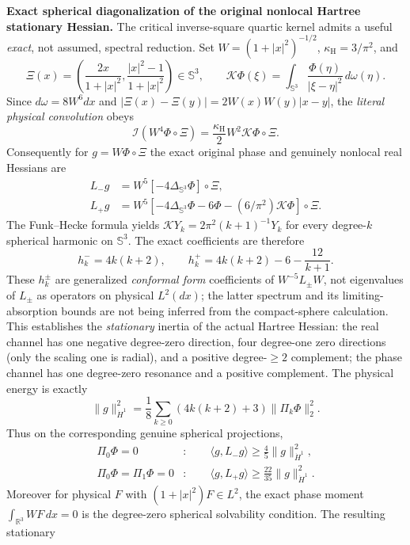 \documentclass[11pt]{amsart}
\begin{document}
\medskip
\noindent\textbf{Exact spherical diagonalization of the original nonlocal Hartree stationary Hessian.}
The critical inverse-square quartic kernel admits a useful
\emph{exact}, not assumed, spectral reduction. Set
\(W=(1+|x|^2)^{-1/2}\), \(\kappa_{\mathrm H}=3/\pi^2\), and
\[
 \Xi(x)=\left(\frac{2x}{1+|x|^2},
                \frac{|x|^2-1}{1+|x|^2}\right)\in\mathbb S^3,
 \qquad
 \mathscr K\Phi(\xi)=
 \int_{\mathbb S^3}\frac{\Phi(\eta)}{|\xi-\eta|^2}\,d\omega(\eta).
\]
Since \(d\omega=8W^6dx\) and
\(|\Xi(x)-\Xi(y)|=2W(x)W(y)|x-y|\), the
\emph{literal physical convolution} obeys
\[
 \mathcal I(W^4\Phi\circ\Xi)
 =\frac{\kappa_{\mathrm H}}2W^2\mathscr K\Phi\circ\Xi.
\]
Consequently for \(g=W\Phi\circ\Xi\) the exact original
phase and genuinely nonlocal real Hessians are
\[
 \begin{split}
 L_-g&=W^5[-4\Delta_{\mathbb S^3}\Phi]\circ\Xi,\\
 L_+g&=W^5[-4\Delta_{\mathbb S^3}\Phi-6\Phi
     -(6/\pi^2)\mathscr K\Phi]\circ\Xi.
 \end{split}
\]
The Funk--Hecke formula yields
\(\mathscr K Y_k=2\pi^2(k+1)^{-1}Y_k\)
for every degree-\(k\) spherical harmonic on \(\mathbb S^3\).
The exact coefficients are therefore
\[
 h_k^-=4k(k+2),\qquad
 h_k^+=4k(k+2)-6-\frac{12}{k+1}.
\]
These \(h_k^\pm\) are generalized \emph{conformal form}
coefficients of \(W^{-5}L_\pm W\), not eigenvalues of
\(L_\pm\) as operators on physical \(L^2(dx)\); the latter
spectrum and its limiting-absorption bounds are not being
inferred from the compact-sphere calculation.
This establishes the \emph{stationary} inertia of the actual
Hartree Hessian: the real channel has one negative degree-zero
direction, four degree-one zero directions (only the scaling one
is radial), and a positive degree-\(\ge2\) complement; the phase
channel has one degree-zero resonance and a positive complement.
The physical energy is exactly
\[
 \|g\|_{\dot H^1}^2
 =\frac18\sum_{k\ge0}(4k(k+2)+3)\|\Pi_k\Phi\|_2^2.
\]
Thus on the corresponding genuine spherical projections,
\[
 \begin{split}
 \Pi_0\Phi=0&:\qquad
     \langle g,L_-g\rangle\ge\frac45\|g\|_{\dot H^1}^2,\\
 \Pi_0\Phi=\Pi_1\Phi=0&:\qquad
     \langle g,L_+g\rangle\ge\frac{22}{35}\|g\|_{\dot H^1}^2.
 \end{split}
\]
Moreover for physical \(F\) with \((1+|x|^2)F\in L^2\),
the exact phase moment
\(\int_{\mathbb R^3}WF\,dx=0\) is the degree-zero
spherical solvability condition. The resulting stationary
\end{document}

